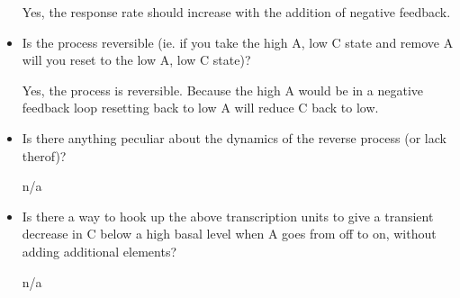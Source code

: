 \documentclass[11pt]{article}
\begin{document}
\begin{itemize}
Yes, the response rate should increase with the addition of negative feedback.   

\item[] Is the process reversible (ie. if you take the high A, low C state and remove A will you reset to the low A, low C state)? 

Yes, the process is reversible. Because the high A would be in a negative feedback loop resetting back to low A will reduce C back to low.

\item[] Is there anything peculiar about the dynamics of the reverse process (or lack therof)?

n/a

\item[] Is there a way to hook up the above transcription units to give a transient decrease in C below a high
 basal level when A goes from off to on, without adding additional elements?

n/a

\end{itemize}
\end{document}
